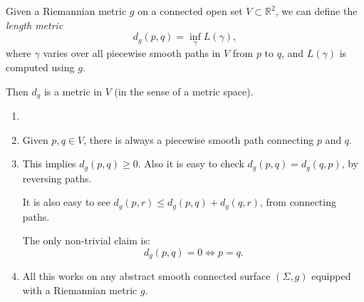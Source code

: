 \documentclass[12pt]{article}
\begin{document}
\begin{proposition}
	Given a Riemannian metric $g$ on a connected open set $V \subset \mathbb{R}^2$, we can define the \emph{length metric}
	\[
	d_g(p, q) = \inf_{\gamma} L(\gamma),
	\]
	where $\gamma$ varies over all piecewise smooth paths in $V$ from $p$ to $q$, and $L(\gamma)$ is computed using $g$.

	Then $d_g$ is a metric in $V$ (in the sense of a metric space).
\end{proposition}

\begin{remark}
	\begin{enumerate}
		\item[]
		\item Given $p, q \in V$, there is always a piecewise smooth path connecting $p$ and $q$.
		\item This implies $d_g(p, q) \geq 0$. Also it is easy to check $d_g(p, q) = d_g(q, p)$, by reversing paths.

			It is also easy to see $d_g(p, r) \leq d_g(p, q) + d_g(q, r)$, from connecting paths.

			The only non-trivial claim is:
			\[
			d_g(p, q) = 0 \iff p = q.
			\]
		\item All this works on any abstract smooth connected surface $(\Sigma, g)$ equipped with a Riemannian metric $g$.
	\end{enumerate}	
\end{remark}

\end{document}
